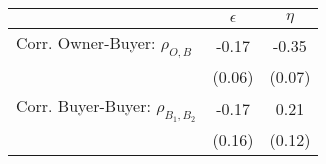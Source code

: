 \begin{tabular}{lcc}
& $\epsilon$ & $\eta$ \\
\hline
Corr. Owner-Buyer: $\rho_{O,B}$ &-0.17&-0.35\\
  & (0.06) & (0.07) \\
Corr. Buyer-Buyer: $\rho_{B_1,B_2}$ &-0.17&0.21\\
 & (0.16) & (0.12) \\
\end{tabular}
